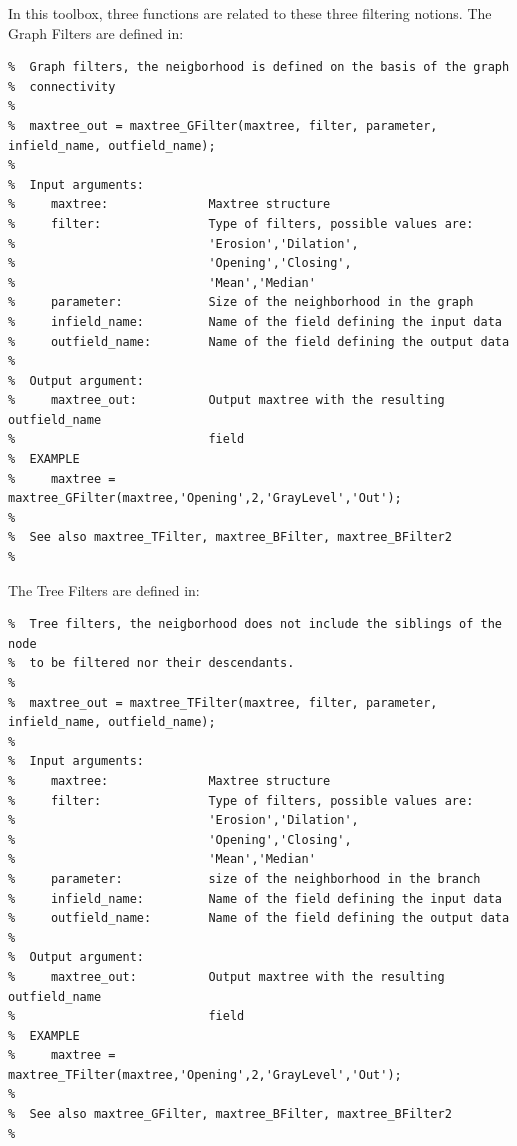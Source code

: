 \documentclass[DIV=calc, paper=a4, fontsize=11pt]{scrartcl}	 %
\begin{document}
In this toolbox, three functions are related to these three filtering notions. The Graph Filters are defined in: 
\begin{lstlisting}[aboveskip=0.5 \baselineskip]
%  maxtree_GFilter computes a Graph Filter on attributes of Maxtrees. In
%  Graph filters, the neigborhood is defined on the basis of the graph
%  connectivity
%
%  maxtree_out = maxtree_GFilter(maxtree, filter, parameter, infield_name, outfield_name);
% 
%  Input arguments:
%     maxtree:              Maxtree structure
%     filter:               Type of filters, possible values are: 
%                           'Erosion','Dilation',
%                           'Opening','Closing',
%                           'Mean','Median'
%     parameter:            Size of the neighborhood in the graph
%     infield_name:         Name of the field defining the input data
%     outfield_name:        Name of the field defining the output data
% 
%  Output argument:
%     maxtree_out:          Output maxtree with the resulting outfield_name
%                           field
%  EXAMPLE 
%     maxtree = maxtree_GFilter(maxtree,'Opening',2,'GrayLevel','Out');
%
%  See also maxtree_TFilter, maxtree_BFilter, maxtree_BFilter2
%
\end{lstlisting}

The Tree Filters are defined in: 
\begin{lstlisting}[aboveskip=0.5 \baselineskip]
%  maxtree_TFilter computes a Tree Filter on attributes of Maxtrees. In
%  Tree filters, the neigborhood does not include the siblings of the node
%  to be filtered nor their descendants. 
%
%  maxtree_out = maxtree_TFilter(maxtree, filter, parameter, infield_name, outfield_name);
%
%  Input arguments:
%     maxtree:              Maxtree structure
%     filter:               Type of filters, possible values are: 
%                           'Erosion','Dilation',
%                           'Opening','Closing',
%                           'Mean','Median'
%     parameter:            size of the neighborhood in the branch
%     infield_name:         Name of the field defining the input data
%     outfield_name:        Name of the field defining the output data
% 
%  Output argument:
%     maxtree_out:          Output maxtree with the resulting outfield_name
%                           field
%  EXAMPLE 
%     maxtree = maxtree_TFilter(maxtree,'Opening',2,'GrayLevel','Out');
%
%  See also maxtree_GFilter, maxtree_BFilter, maxtree_BFilter2
%
\end{lstlisting}
\end{document}
